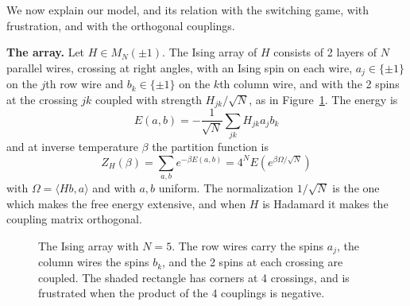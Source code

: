 \documentclass[11pt,a4paper]{article}
\theoremstyle{remark}
\begin{document}
We now explain our model, and its relation with the switching game, with frustration, and with the orthogonal couplings.

\medskip

\noindent\textbf{The array.}
Let $H\in M_N(\pm1)$. The Ising array of $H$ consists of 2 layers of $N$ parallel wires, crossing at right angles, with an Ising spin on each wire, $a_j\in\{\pm1\}$ on the $j$th row wire and $b_k\in\{\pm1\}$ on the $k$th column wire, and with the 2 spins at the crossing $jk$ coupled with strength $H_{jk}/\sqrt N$, as in Figure~\ref{fig:array}. The energy is
\[
 E(a,b)=-\frac{1}{\sqrt N}\sum_{jk}H_{jk}a_jb_k
\]
and at inverse temperature $\beta$ the partition function is
\[
 Z_H(\beta)=\sum_{a,b}e^{-\beta E(a,b)}=4^NE\left(e^{\beta\Omega/\sqrt N}\right)
\]
with $\Omega=\langle Hb,a\rangle$ and with $a,b$ uniform. The normalization $1/\sqrt N$ is the one which makes the free energy extensive, and when $H$ is Hadamard it makes the coupling matrix orthogonal.

\begin{figure}[htb!]
\centering
{}
\caption{The Ising array with $N=5$. The row wires carry the spins $a_j$, the column wires the spins $b_k$, and the 2 spins at each crossing are coupled. The shaded rectangle has corners at 4 crossings, and is frustrated when the product of the 4 couplings is negative.}\label{fig:array}
\end{figure}
\end{document}
